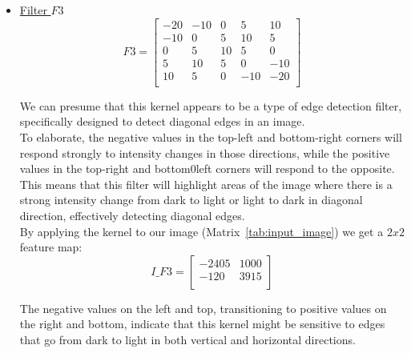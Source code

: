 \begin{itemize}
	\item \underline{Filter $F3$}\\
	
	\begin{equation}
		F3 = \begin{bmatrix}
			-20 & -10 & 0 & 5 & 10   \\
			-10 & 0 & 5 & 10 & 5  \\
			 0 & 5 & 10 & 5 & 0   \\
			 5 & 10 & 5 & 0 & -10 \\
			10 & 5 & 0 & -10 & -20\\
		\end{bmatrix}
	\end{equation}
	\vspace{2mm}
	
	We can presume that this kernel appears to be a type of edge detection filter, specifically designed to detect diagonal edges in an image.\\
	
	To elaborate, the negative values in the top-left and bottom-right corners will respond strongly to intensity changes in those directions, while the positive values in the top-right and bottom0left corners will respond to the opposite. This means that this filter will highlight areas of the image where there is a strong intensity change from dark to light or light to dark in diagonal direction, effectively detecting diagonal edges.\\
	
	By applying the kernel to our image (Matrix~\ref{tab:input_image}) we get a $2 x 2$ feature map:
	\begin{equation}
		I\_F3 = \begin{bmatrix}
			-2405 & 1000 \\
			-120 & 3915  \\
		\end{bmatrix}
	\end{equation}
	\vspace{2mm}
	
	The negative values on the left and top, transitioning to positive values on the right and bottom, indicate that this kernel might be sensitive to edges that go from dark to light in both vertical and horizontal directions.\\
	

\end{itemize}
